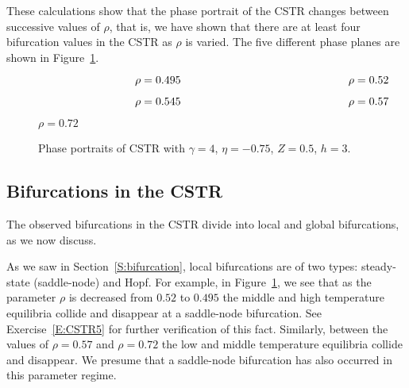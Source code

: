 \documentclass{ximera}
\begin{document}
These calculations show that the phase portrait of the CSTR changes 
between successive values of $\rho$, that is, we have shown that 
there are at least four bifurcation values in the CSTR as $\rho$ 
is varied.  The five different phase planes are shown in Figure~\ref{F:CSTR}.


\begin{figure}
           \centerline{%
	   }	
		\vspace*{-0.2in}	
		$\hspace{1.2in} \mbox{$\rho=0.495$ \hspace{2.0in} $\rho=0.52$}$
           \centerline{%
	   }
		\vspace*{-0.4in}
		
		$\hspace{1.2in} \mbox{$\rho=0.545$ \hspace{2.0in} $\rho=0.57$}$
		\vspace{0.4in}
	   \centerline{%
           }
 		\vspace*{-0.8in}
		
		\hspace{2.6in} $\rho=0.72$
          \caption{Phase portraits of CSTR \protect{} 
	with $\gamma=4$, $\eta=-0.75$, $Z=0.5$, $h =3$.}
           \label{F:CSTR}
\end{figure}


\subsection*{Bifurcations in the CSTR}


The observed bifurcations in the CSTR divide into local and global 
bifurcations, as we now discuss.

As we saw in Section~\ref{S:bifurcation}, local bifurcations are of two 
types: steady-state (saddle-node) and Hopf.  
  For example, in Figure~\ref{F:CSTR}, we see that as 
the parameter $\rho$ is decreased from $0.52$ to $0.495$ the middle and high 
temperature equilibria collide and disappear at a saddle-node bifurcation.  
See Exercise~\ref{E:CSTR5} for further verification of this fact.  Similarly,
between the values of $\rho=0.57$ and $\rho=0.72$ the low and middle 
temperature equilibria collide and disappear.  We presume that a  
saddle-node bifurcation has also occurred in this parameter regime.
\end{document}

